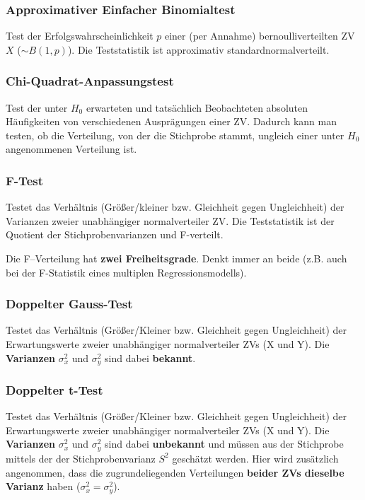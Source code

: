 \documentclass[a4paper]{article}
\newcommand\dangersign[1][2ex]{%
  \renewcommand\stacktype{L}%
  \scaleto{\stackon[1.3pt]{\color{red}$\triangle$}{\tiny !}}{#1}%
}
\begin{document}
\subsubsection{Approximativer Einfacher Binomialtest}\label{sec:bintest1}
Test der Erfolgswahrscheinlichkeit $p$ einer (per Annahme) bernoulliverteilten ZV $X$ ($\sim B(1, p)$). Die Teststatistik ist approximativ standardnormalverteilt. 

\subsubsection{Chi-Quadrat-Anpassungstest}\label{sec:chitest1}
Test der unter $H_0$ erwarteten und tatsächlich Beobachteten absoluten Häufigkeiten von verschiedenen Ausprägungen einer ZV. Dadurch kann man testen, ob die Verteilung, von der die Stichprobe stammt, ungleich einer unter $H_0$ angenommenen Verteilung ist.

\subsubsection{F-Test}\label{sec:ftest}
Testet das Verhältnis (Größer/kleiner bzw. Gleichheit gegen Ungleichheit) der Varianzen zweier unabhängiger normalverteiler ZV. Die Teststatistik ist der Quotient der Stichprobenvarianzen und F-verteilt.

\noindent \dangersign[3ex] Die F--Verteilung hat \textbf{zwei Freiheitsgrade}. Denkt immer an beide (z.B. auch bei der F-Statistik eines multiplen Regressionsmodells).

\subsubsection{Doppelter Gauss-Test}\label{sec:Gausstest2}
Testet das Verhältnis (Größer/Kleiner bzw. Gleichheit gegen Ungleichheit) der Erwartungswerte zweier unabhängiger normalverteiler ZVs (X und Y). Die \textbf{Varianzen} $\sigma_x^2$ und $\sigma_y^2$ sind dabei \textbf{bekannt}. 

\subsubsection{Doppelter t-Test}\label{sec:tTest2}
Testet das Verhältnis (Größer/Kleiner bzw. Gleichheit gegen Ungleichheit) der Erwartungswerte zweier unabhängiger normalverteiler ZVs (X und Y). Die \textbf{Varianzen} $\sigma_x^2$ und $\sigma_y^2$ sind dabei \textbf{unbekannt} und müssen aus der Stichprobe mittels der der Stichprobenvarianz $S^2$ geschätzt werden. Hier wird zusätzlich angenommen, dass die zugrundeliegenden Verteilungen \textbf{beider ZVs dieselbe Varianz} haben ($\sigma_x^2 =\sigma_y^2$). 
\end{document}
